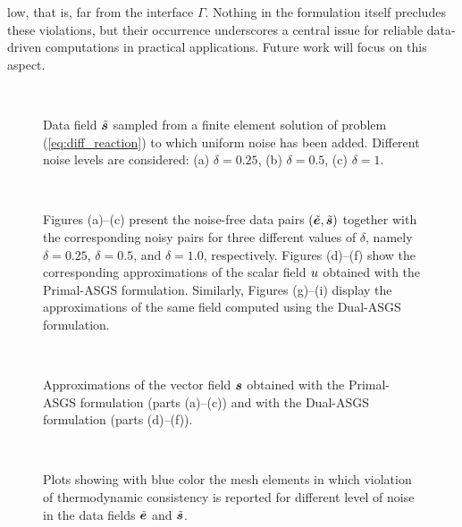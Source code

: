 low, that is, far from the interface $\Gamma$. Nothing in the formulation itself precludes 
these violations, but their occurrence underscores a central issue for reliable data-driven
computations in practical applications. Future work will focus on this aspect.
\begin{figure}[ht!!]
	\centering
	\caption{Data field $\tilde{\bm{s}}$ sampled from a finite element solution of problem
		(\ref{eq:diff_reaction}) to which uniform noise has been added. Different noise levels are considered: (a) $\delta=0.25$, (b) $\delta=0.5$, (c) $\delta=1$.}
	~\\
	\fontsize{12pt}{10pt}\selectfont 
	\def\svgwidth{1.0\columnwidth}
	
	\label{fig:st_with_noise}
\end{figure}

\begin{figure}[h!]
	\centering
	\caption{Figures (a)--(c) present the noise-free data pairs $(\tilde{\bm{e}},\tilde{\bm{s}})$ together with the corresponding noisy pairs for three different values of $\delta$, namely $\delta = 0.25$, $\delta = 0.5$, and $\delta = 1.0$, respectively. Figures (d)--(f) show the corresponding approximations of the scalar field $u$ obtained with the Primal-ASGS formulation. Similarly, Figures (g)--(i) display the approximations of the same field computed using the Dual-ASGS formulation.}
	~\\
	\def\svgwidth{1.0\columnwidth}
	
	\label{fig:noise_graph_and_u}
\end{figure}

\begin{figure}[h!]
	\centering
	\caption{Approximations of the vector field $\bm{s}$ obtained with the Primal-ASGS formulation (parts (a)--(c)) and with the Dual-ASGS formulation (parts (d)--(f)).}
	~\\
	\def\svgwidth{1.0\columnwidth}
	
	\label{fig:noise_s}
\end{figure}

\begin{figure}[h!]
	\centering
	\caption{Plots showing with blue color the mesh elements in which violation of thermodynamic consistency is reported for different level of noise in the data fields $\tilde{\bm{e}}$ and $\tilde{\bm{s}}$.}
	~\\
	\def\svgwidth{1.0\columnwidth}
	
	\label{fig:noise_s_dot_e}
\end{figure}



